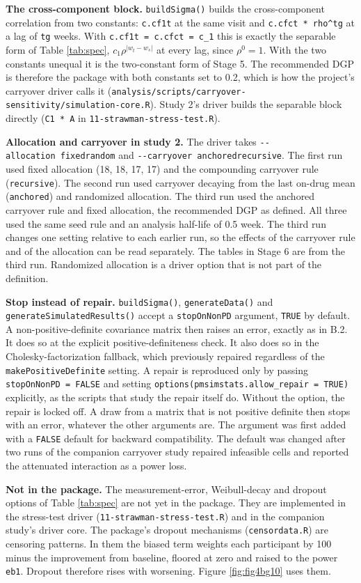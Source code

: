 \documentclass[
  11pt,
]{article}
\begin{document}
\textbf{The cross-component block.} \texttt{buildSigma()} builds the
cross-component correlation from two constants: \texttt{c.cf1t} at the same
visit and \texttt{c.cfct\ *\ rho\^{}tg} at a lag of \texttt{tg} weeks. With
\texttt{c.cf1t\ =\ c.cfct\ =\ c\_1} this is exactly the separable form of Table
\ref{tab:spec}, \(c_1\rho^{\lvert w_t - w_s\rvert}\) at every lag, since
\(\rho^0 = 1\). With the two constants unequal it is the two-constant
form of Stage 5. The recommended DGP is therefore the package with both
constants set to 0.2, which is how the project's carryover driver
calls it (\texttt{analysis/scripts/carryover-sensitivity/simulation-core.R}).
Study 2's driver builds the separable block directly
(\texttt{C1\ *\ A} in \texttt{11-strawman-stress-test.R}).

\textbf{Allocation and carryover in study 2.} The driver takes
\texttt{-\/-allocation\ fixed\textbar{}random} and \texttt{-\/-carryover\ anchored\textbar{}recursive}. The
first run used fixed allocation (18, 18, 17, 17) and the compounding
carryover rule (\texttt{recursive}). The second run used carryover decaying
from the last on-drug mean (\texttt{anchored}) and randomized allocation. The
third run used the anchored carryover rule and fixed allocation, the
recommended
DGP as defined. All three used the same seed rule and an analysis
half-life of 0.5 week. The third run changes one setting relative to
each earlier run, so the effects of the carryover rule and of the
allocation can be read separately. The tables in Stage 6 are from the
third run. Randomized allocation is a driver option that is not part
of the definition.

\textbf{Stop instead of repair.} \texttt{buildSigma()}, \texttt{generateData()} and
\texttt{generateSimulatedResults()} accept a \texttt{stopOnNonPD} argument, \texttt{TRUE}
by default. A non-positive-definite covariance matrix then raises an
error, exactly as in B.2. It does so at the explicit
positive-definiteness check. It also does so in the
Cholesky-factorization fallback, which previously repaired regardless
of the \texttt{makePositiveDefinite} setting. A repair is reproduced only by
passing \texttt{stopOnNonPD\ =\ FALSE} and setting
\texttt{options(pmsimstats.allow\_repair\ =\ TRUE)} explicitly, as the scripts
that study the repair itself do. Without the option, the repair is
locked off. A draw from a matrix that is not positive definite then
stops with an error, whatever the other arguments are. The argument
was first added with a \texttt{FALSE} default for backward compatibility.
The default was changed after two runs of the companion carryover
study repaired infeasible cells and reported the attenuated
interaction as a power loss.

\textbf{Not in the package.} The measurement-error, Weibull-decay and
dropout options of Table \ref{tab:spec} are not yet in the package.
They are implemented in the stress-test driver
(\texttt{11-strawman-stress-test.R}) and in the companion study's driver
core. The package's dropout
mechanisms (\texttt{censordata.R}) are censoring patterns. In them the biased
term weights each participant by 100 minus the improvement from
baseline, floored at zero and raised to the power \texttt{eb1}. Dropout
therefore rises with worsening. Figure \ref{fig:fig4bg10} uses them.
\end{document}
